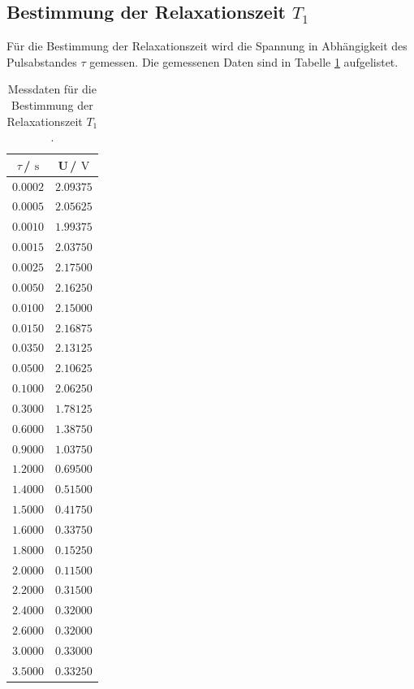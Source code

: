 \subsection{Bestimmung der Relaxationszeit $T_{\text{1}}$}
Für die Bestimmung der Relaxationszeit wird die Spannung in Abhängigkeit des Pulsabstandes $\tau$ gemessen.
Die gemessenen Daten sind in Tabelle \ref{tab:T1_Data} aufgelistet.
\begin{table}
  \centering
  \caption{Messdaten für die Bestimmung der Relaxationszeit $T_{\text{1}}$.}
  \label{tab:T1_Data}
  \begin{tabular}{c c}
    \toprule
    $\tau$\,/\,$\SI{}{\second}$&U\,/\,$\SI{}{\volt}$\\
    \midrule
    $\num{0.0002}$&$\num{2.09375}$\\
    $\num{0.0005}$&$\num{2.05625}$\\
    $\num{0.0010}$&$\num{1.99375}$\\
    $\num{0.0015}$&$\num{2.03750}$\\
    $\num{0.0025}$&$\num{2.17500}$\\
    $\num{0.0050}$&$\num{2.16250}$\\
    $\num{0.0100}$&$\num{2.15000}$\\
    $\num{0.0150}$&$\num{2.16875}$\\
    $\num{0.0350}$&$\num{2.13125}$\\
    $\num{0.0500}$&$\num{2.10625}$\\
    $\num{0.1000}$&$\num{2.06250}$\\
    $\num{0.3000}$&$\num{1.78125}$\\
    $\num{0.6000}$&$\num{1.38750}$\\
    $\num{0.9000}$&$\num{1.03750}$\\
    $\num{1.2000}$&$\num{0.69500}$\\
    $\num{1.4000}$&$\num{0.51500}$\\
    $\num{1.5000}$&$\num{0.41750}$\\
    $\num{1.6000}$&$\num{0.33750}$\\
    $\num{1.8000}$&$\num{0.15250}$\\
    $\num{2.0000}$&$\num{0.11500}$\\
    $\num{2.2000}$&$\num{0.31500}$\\
    $\num{2.4000}$&$\num{0.32000}$\\
    $\num{2.6000}$&$\num{0.32000}$\\
    $\num{3.0000}$&$\num{0.33000}$\\
    $\num{3.5000}$&$\num{0.33250}$\\
    \bottomrule
  \end{tabular}
\end{table}
